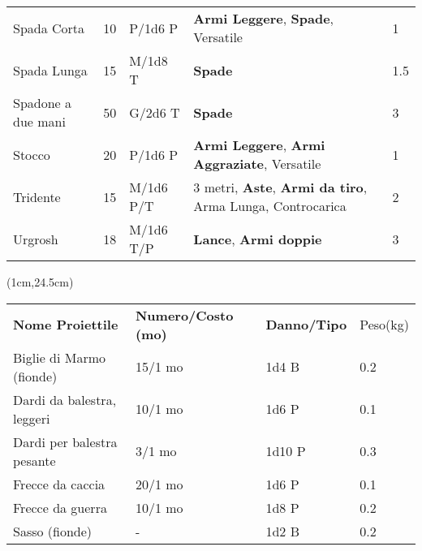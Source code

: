 \documentclass[a4paper,12 pt,openany]{book}
\begin{document}
\begin{textblock*}{19.5cm}
\begin{tabular}{lllll}
Spada Corta& 10 & P/1d6 P&\textbf{Armi Leggere}, \textbf{Spade}, Versatile& 1\\
Spada Lunga& 15 & M/1d8 T&\textbf{Spade}& 1.5\\
Spadone a due mani& 50 & G/2d6 T&\textbf{Spade}& 3\\
Stocco& 20 & P/1d6 P& \textbf{Armi Leggere}, \textbf{Armi Aggraziate}, Versatile& 1\\
Tridente& 15 & M/1d6 P/T& 3 metri, \textbf{Aste}, \textbf{Armi da tiro}, Arma Lunga, Controcarica& 2\\
Urgrosh& 18 & M/1d6 T/P& \textbf{Lance}, \textbf{Armi doppie} & 3\\
\end{tabular}


	\end{textblock*}

	\begin{textblock*}{13cm}(1cm,24.5cm) %

		\footnotesize

\begin{tabular}{llll}
\textbf{Nome Proiettile}   & \textbf{Numero/Costo (mo)} & \textbf{Danno/Tipo} & Peso(kg) \\
Biglie di Marmo (fionde)   & 15/1 mo                    & 1d4 B               & 0.2      \\
Dardi da balestra, leggeri & 10/1 mo                    & 1d6 P               & 0.1      \\
Dardi per balestra pesante & 3/1 mo                     & 1d10 P              & 0.3      \\
Frecce da caccia           & 20/1 mo                    & 1d6 P               & 0.1      \\
Frecce da guerra           & 10/1 mo                    & 1d8 P               & 0.2      \\
Sasso (fionde)             & -                          & 1d2 B               & 0.2      \\
\end{tabular}

	\end{textblock*}

		~\newpage
\end{document}
